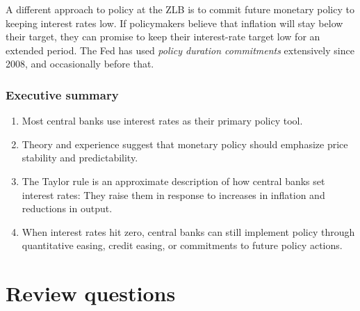 A different approach to policy at the ZLB is to commit future monetary
policy to keeping interest rates low.
If policymakers believe that inflation will stay below their target,
they can promise to keep their interest-rate target low
for an extended period.
The Fed has used {\it   policy duration commitments\/}  
extensively since 2008, and occasionally before that.

\subsubsection*{Executive summary}

\setlength{\leftmargini}{.5\oldleftmargini}
\begin{enumerate}
\item Most central banks use interest rates as their primary policy tool.

\item Theory and experience suggest that monetary policy
should emphasize price stability and predictability.

\item The Taylor rule is an approximate description of how
central banks set interest rates: They raise them in response to
increases in inflation and reductions in output.

\item When interest rates hit zero, central banks can still implement
policy through quantitative easing, credit easing, or
commitments to future policy actions.
\end{enumerate}
\setlength{\leftmargini}{\oldleftmargini}


\section*{Review questions}

